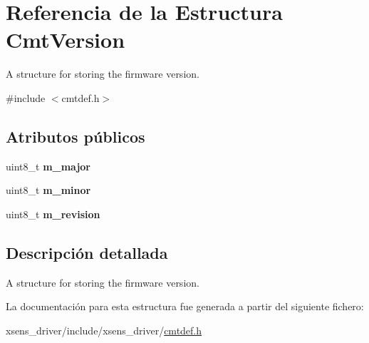 \hypertarget{structCmtVersion}{\section{\-Referencia de la \-Estructura \-Cmt\-Version}
\label{structCmtVersion}
}


\-A structure for storing the firmware version.  




{\ttfamily \#include $<$cmtdef.\-h$>$}

\subsection*{\-Atributos públicos}
\begin{DoxyCompactItemize}
\item 
\hypertarget{structCmtVersion_afb143c9ca1756f9cff14d72209c8ac8e}{uint8\-\_\-t {\bfseries m\-\_\-major}}\label{structCmtVersion_afb143c9ca1756f9cff14d72209c8ac8e}

\item 
\hypertarget{structCmtVersion_acd53eafaa967e68bedbffb5c0ed2c84d}{uint8\-\_\-t {\bfseries m\-\_\-minor}}\label{structCmtVersion_acd53eafaa967e68bedbffb5c0ed2c84d}

\item 
\hypertarget{structCmtVersion_a91e5c4d62e1e64dddd8e68e91ce9b500}{uint8\-\_\-t {\bfseries m\-\_\-revision}}\label{structCmtVersion_a91e5c4d62e1e64dddd8e68e91ce9b500}

\end{DoxyCompactItemize}


\subsection{\-Descripción detallada}
\-A structure for storing the firmware version. 

\-La documentación para esta estructura fue generada a partir del siguiente fichero\-:\begin{DoxyCompactItemize}
\item 
xsens\-\_\-driver/include/xsens\-\_\-driver/\hyperlink{cmtdef_8h}{cmtdef.\-h}\end{DoxyCompactItemize}
